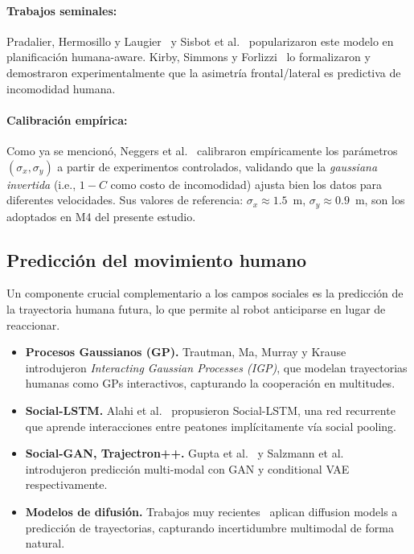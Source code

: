 \documentclass[12pt,a4paper,oneside]{book}
\begin{document}
\paragraph{Trabajos seminales:} Pradalier, Hermosillo y Laugier~\cite{Pradalier2003} y Sisbot et al.~\cite{Sisbot2007} popularizaron este modelo en planificación humana-aware. Kirby, Simmons y Forlizzi~\cite{Kirby2009} lo formalizaron y demostraron experimentalmente que la asimetría frontal/lateral es predictiva de incomodidad humana.

\paragraph{Calibración empírica:} Como ya se mencionó, Neggers et al.~\cite{Neggers2024} calibraron empíricamente los parámetros $(\sigma_x, \sigma_y)$ a partir de experimentos controlados, validando que la \emph{gaussiana invertida} (i.e., $1-C$ como costo de incomodidad) ajusta bien los datos para diferentes velocidades. Sus valores de referencia: $\sigma_x \approx 1.5$~m, $\sigma_y \approx 0.9$~m, son los adoptados en M4 del presente estudio.

\subsection{Predicción del movimiento humano}

Un componente crucial complementario a los campos sociales es la predicción de la trayectoria humana futura, lo que permite al robot anticiparse en lugar de reaccionar.

\begin{itemize}
    \item \textbf{Procesos Gaussianos (GP).} Trautman, Ma, Murray y Krause~\cite{Trautman2013,Trautman2015} introdujeron \emph{Interacting Gaussian Processes (IGP)}, que modelan trayectorias humanas como GPs interactivos, capturando la cooperación en multitudes.
    \item \textbf{Social-LSTM.} Alahi et al.~\cite{Alahi2016} propusieron Social-LSTM, una red recurrente que aprende interacciones entre peatones implícitamente vía social pooling.
    \item \textbf{Social-GAN, Trajectron++.} Gupta et al.~\cite{Gupta2018} y Salzmann et al.~\cite{Salzmann2020} introdujeron predicción multi-modal con GAN y conditional VAE respectivamente.
    \item \textbf{Modelos de difusión.} Trabajos muy recientes~\cite{Mao2024} aplican diffusion models a predicción de trayectorias, capturando incertidumbre multimodal de forma natural.
\end{itemize}
\end{document}
